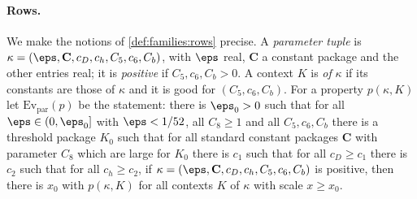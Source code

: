 \paragraph{Rows.}
We make the notions of \cref{def:families:rows} precise. A \emph{parameter tuple} is
$\kappa=(\eps,\mathbf C,c_D,c_h,C_5,c_6,C_b)$, with $\eps$ real, $\mathbf C$ a constant package and the other entries real; it is
\emph{positive} if $C_5,c_6,C_b>0$. A context $K$ is \emph{of} $\kappa$ if its constants are those of $\kappa$ and it is good for
$(C_5,c_6,C_b)$. For a property $p(\kappa,K)$ let $\mathrm{Ev}_{\mathrm{par}}(p)$ be the statement: there is $\eps_0>0$ such that for all
$\eps\in(0,\eps_0]$ with $\eps<1/52$, all $C_8\ge1$ and all $C_5,c_6,C_b$ there is a threshold package $K_0$ such that for all standard
constant packages $\mathbf C$ with parameter $C_8$ which are large for $K_0$ there is $c_1$ such that for all $c_D\ge c_1$ there is $c_2$
such that for all $c_h\ge c_2$, if $\kappa=(\eps,\mathbf C,c_D,c_h,C_5,c_6,C_b)$ is positive, then there is $x_0$ with $p(\kappa,K)$
for all contexts $K$ of $\kappa$ with scale $x\ge x_0$.

